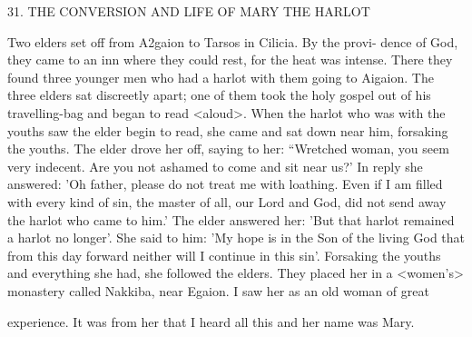 31.
THE CONVERSION AND LIFE
OF MARY THE HARLOT

Two elders set off from A2gaion to Tarsos in Cilicia.
By the provi-
dence of God, they came to an inn where they could rest, for the
heat was intense.
There they found three younger men who had a
harlot with them going to Aigaion.
The three elders sat discreetly
apart; one of them took the holy gospel out of his travelling-bag
and began to read <aloud>.
When the harlot who was with the
youths saw the elder begin to read, she came and sat down near
him, forsaking the youths.
The elder drove her off, saying to her:
“Wretched woman, you seem very indecent.
Are you not ashamed
to come and sit near us?' In reply she answered: 'Oh father, please
do not treat me with loathing.
Even if I am filled with every kind of
sin, the master of all, our Lord and God, did not send away the
harlot who came to him.' The elder answered her: 'But that harlot
remained a harlot no longer'.
She said to him: 'My hope is in the
Son of the living God that from this day forward neither will I
continue in this sin'.
Forsaking the youths and everything she had,
she followed the elders.
They placed her in a <women's> monastery
called Nakkiba, near Egaion.
I saw her as an old woman of great

experience.
It was from her that I heard all this and her name was
Mary.

